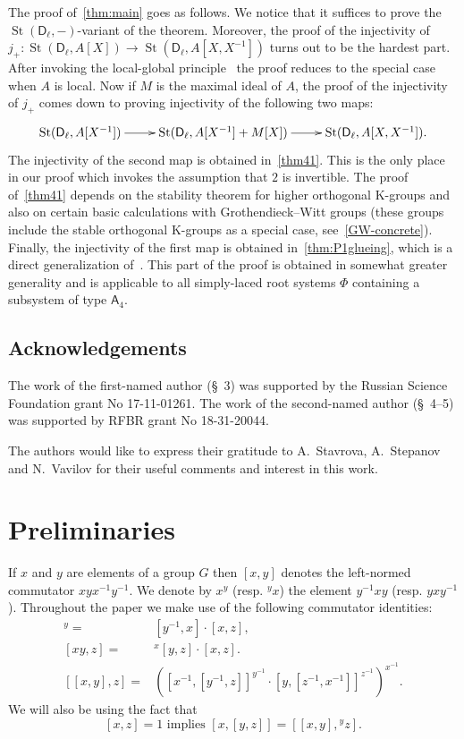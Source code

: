 \documentclass[oneside, 8pt]{amsart}
\theoremstyle{remark}
\theoremstyle{definition}
\numberwithin{lemma}{section}
\numberwithin{prop}{section}
\numberwithin{corollary}{section}
\numberwithin{externaltheorem}{section}
\DeclareMathOperator{\St}{St}
\newcommand{\inv}{^{-1}}
\newcommand{\rA}{\mathsf{A}}
\newcommand{\rD}{\mathsf{D}}
\newcommand{\rE}{\mathsf{E}}
\numberwithin{equation}{section}
\begin{document}
The proof of~\cref{thm:main} goes as follows. We notice that it suffices to prove the $\St(\rD_\ell, -)$-variant of the theorem. Moreover, the proof of the injectivity of
$j_+ \colon \St(\rD_\ell, A[X]) \to \St(\rD_\ell, A[X, X\inv])$ turns out to be the hardest part. After invoking the local-global principle~\cite[Theorem~2]{LS17} the proof reduces to the special case when $A$ is local.
Now if $M$ is the maximal ideal of $A$, the proof of the injectivity of $j_+$ comes down to proving injectivity of the following two maps:
\[ \xymatrix{ \St(\rD_\ell, A[X^{-1}]) \ar[r] & \St(\rD_\ell, A[X\inv] + M[X]) \ar[r] & \St(\rD_\ell, A[X, X\inv]). }\]
The injectivity of the second map is obtained in~\cref{thm41}. This is the only place in our proof which invokes the assumption that $2$ is invertible. The proof of~\cref{thm41} depends on the stability theorem for higher orthogonal K-groups and also on certain basic calculations with Grothendieck--Witt groups (these groups include the stable orthogonal K-groups as a special case, see~\eqref{GW-concrete}). Finally, the injectivity of the first map is obtained in~\cref{thm:P1glueing}, which is a direct generalization of~\cite[Proposition~4.3]{Tu83}. This part of the proof is obtained in somewhat greater generality and is applicable to all simply-laced root systems $\Phi$ containing a subsystem of type $\rA_4$.

\subsection{Acknowledgements} 
The work of the first-named author (\S~3) was supported by the Russian Science Foundation grant No 17-11-01261.
The work of the second-named author (\S~4--5) was supported by RFBR grant No 18-31-20044.

The authors would like to express their gratitude to A.~Stavrova, A.~Stepanov and N.~Vavilov for their useful comments and interest in this work.

\section{Preliminaries}
If $x$ and $y$ are elements of a group $G$ then $[x, y]$ denotes the left-normed commutator $xyx^{-1}y^{-1}$.
We denote by $x^y$ (resp. ${}^y\!x$) the element $y^{-1}xy$ (resp. $yxy^{-1}$). 
Throughout the paper we make use of the following commutator identities:
\begin{align}
 [x, yz]^y =& [y^{-1}, x] \cdot [x, z], \label{rel43} \\ 
 \label{eq:H1ii} [xy, z] =& {}^x[y, z] \cdot [x,z]. \\
 [[x, y], z] =& \left([x^{-1}, [ y^{-1}, z]] ^ {y^{-1}} \cdot [y, [ z^{-1}, x^{-1}]] ^ {z^{-1}} \right)^{x^{-1}}. \label{HW-variant} \end{align}
We will also be using the fact that 
\begin{equation} \label{eq:H1iii} [x,z] = 1 \text{ implies } [x, [y,z]] = [[x,y],{}^yz]. \end{equation} 
\end{document}
